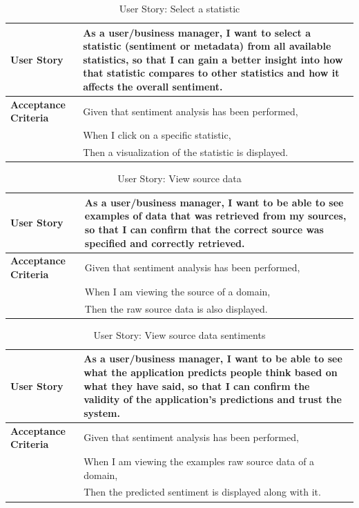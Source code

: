 \documentclass[12pt]{article}
\begin{document}
\begin{table}[htbp]
\caption{User Story: Select a statistic}
\begin{tabular}{|p{}|p{}|}
\hline
\textbf{User Story} & As a user/business manager, I want to select a statistic (sentiment or metadata) from all available statistics, so that I can gain a better insight into how that statistic compares to other statistics and how it affects the overall sentiment. \\
\hline
\textbf{Acceptance Criteria} & 
Given that sentiment analysis has been performed,\\
& When I click on a specific statistic,\\
& Then a visualization of the statistic is displayed. \\
\hline
\end{tabular}
\end{table}

\begin{table}[htbp]
\caption{User Story: View source data}
\begin{tabular}{|p{}|p{}|}
\hline
\textbf{User Story} & As a user/business manager, I want to be able to see examples of data that was retrieved from my sources, so that I can confirm that the correct source was specified and correctly retrieved. \\
\hline
\textbf{Acceptance Criteria} & 
Given that sentiment analysis has been performed,\\
& When I am viewing the source of a domain,\\
& Then the raw source data is also displayed. \\
\hline
\end{tabular}
\end{table}

\begin{table}[htbp]
\caption{User Story: View source data sentiments}
\begin{tabular}{|p{}|p{}|}
\hline
\textbf{User Story} & As a user/business manager, I want to be able to see what the application predicts people think based on what they have said, so that I can confirm the validity of the application’s predictions and trust the system. \\
\hline
\textbf{Acceptance Criteria} & 
Given that sentiment analysis has been performed,\\
& When I am viewing the examples raw source data of a domain,\\
& Then the predicted sentiment is displayed along with it. \\
\hline
\end{tabular}
\end{table}
\newpage
\end{document}
